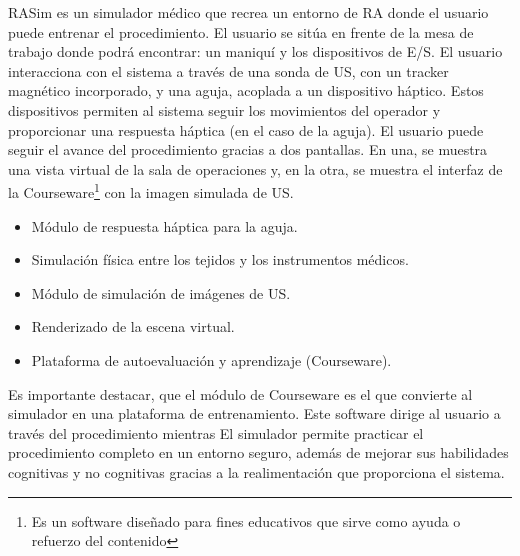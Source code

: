 %
\ac{RASim} es un simulador médico que recrea un entorno de \ac{RA} donde el usuario puede entrenar el procedimiento. El usuario se sitúa en frente de la mesa de trabajo donde podrá encontrar: un maniquí y los dispositivos de \ac{E/S}.
El usuario interacciona con el sistema a través de una sonda de \ac{US}, con un \ac{tracker} magnético incorporado, y una aguja, acoplada a un dispositivo háptico. Estos dispositivos permiten al sistema seguir los movimientos del operador y proporcionar una respuesta háptica (en el caso de la aguja).
El usuario puede seguir el avance del procedimiento gracias a dos pantallas. En una, se muestra una vista virtual de la sala de operaciones  y, en la otra, se muestra el interfaz de la \ac{Courseware}\footnote{Es un software diseñado para fines educativos que sirve como ayuda o refuerzo del contenido} con la imagen simulada de \ac{US}.
%
\begin{itemize}
    \item Módulo de respuesta háptica para la aguja.
    \item Simulación física entre los tejidos y los instrumentos médicos.
    \item Módulo de simulación de imágenes de \ac{US}.
    \item Renderizado de la escena virtual.
    \item Plataforma de autoevaluación y aprendizaje (\acs{Courseware}).
\end{itemize}

Es importante destacar, que el módulo de \ac{Courseware} es el que convierte al simulador en una plataforma de entrenamiento. Este software dirige al usuario a través del procedimiento mientras  
%
El simulador permite practicar el procedimiento completo en un entorno seguro, además de mejorar sus habilidades cognitivas y no cognitivas gracias a la realimentación que proporciona el sistema.

